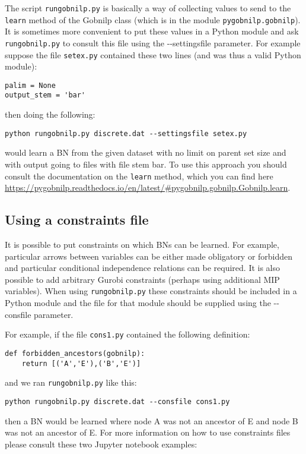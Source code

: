 \documentclass{article}
\begin{document}
The script \texttt{rungobnilp.py} is basically a way of collecting
values to send to the \texttt{learn} method of the Gobnilp class (which is in
the module \texttt{pygobnilp.gobnilp}). It is sometimes more
convenient to put these values in a Python module and ask
\texttt{rungobnilp.py} to consult this file using the -{}-settingsfile
parameter. For example suppose the file \texttt{setex.py} contained
these two lines (and was thus a valid Python module):
\begin{verbatim}
palim = None
output_stem = 'bar'
\end{verbatim}
then doing the following:
\begin{verbatim}
python rungobnilp.py discrete.dat --settingsfile setex.py
\end{verbatim}
would learn a BN from the given dataset with no limit on parent set
size and with output going to files with file stem bar. To use this
approach you should consult the documentation on the \texttt{learn}
method, which you can find here
\url{https://pygobnilp.readthedocs.io/en/latest/#pygobnilp.gobnilp.Gobnilp.learn}.

\subsection{Using a constraints file}
\label{sec:constraints}

It is possible to put constraints on which BNs can be learned. For
example, particular arrows between variables can be either made
obligatory or forbidden and particular conditional independence
relations can be required. It is also possible to add arbitrary Gurobi
constraints (perhaps using additional MIP variables). When using
\texttt{rungobnilp.py} these constraints should be included in a
Python module and the file for that module should be supplied using
the -{}-consfile parameter.

For example, if the file \texttt{cons1.py} contained the following definition:
\begin{verbatim}
def forbidden_ancestors(gobnilp):
    return [('A','E'),('B','E')]
\end{verbatim}
and we ran \texttt{rungobnilp.py} like this:
\begin{verbatim}
python rungobnilp.py discrete.dat --consfile cons1.py
\end{verbatim}
then a BN would be learned where node A was not an ancestor of E and
node B was not an ancestor of E. For more information on how to use
constraints files please consult these two Jupyter notebook examples:
\end{document}
